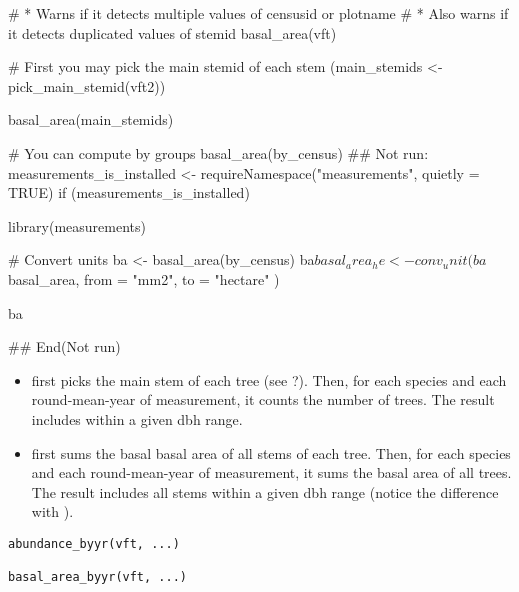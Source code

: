 \documentclass[a4paper]{book}
\begin{document}
\begin{Examples}
\begin{ExampleCode}
# * Warns if it detects multiple values of censusid or plotname
# * Also warns if it detects duplicated values of stemid
basal_area(vft)

# First you may pick the main stemid of each stem
(main_stemids <- pick_main_stemid(vft2))

basal_area(main_stemids)

# You can compute by groups
basal_area(by_census)
## Not run: 
measurements_is_installed <- requireNamespace("measurements", quietly = TRUE)
if (measurements_is_installed) {
  library(measurements)

  # Convert units
  ba <- basal_area(by_census)
  ba$basal_area_he <- conv_unit(
    ba$basal_area,
    from = "mm2",
    to = "hectare"
  )

  ba
}

## End(Not run)

\end{ExampleCode}
\end{Examples}
%
\begin{Description}\relax
\begin{itemize}

\item {} first picks the main stem of each tree (see
?). Then, for each species and each
round-mean-year of measurement, it counts the number of trees. The result
includes  within a given dbh range.
\item {} first sums the basal basal area of all stems of each
tree. Then, for each species and each round-mean-year of measurement,
it sums the basal area of all trees. The result includes all stems within a
given dbh range (notice the difference with ).

\end{itemize}

\end{Description}
%
\begin{Usage}
\begin{verbatim}
abundance_byyr(vft, ...)

basal_area_byyr(vft, ...)
\end{verbatim}
\end{Usage}
%
\end{document}
